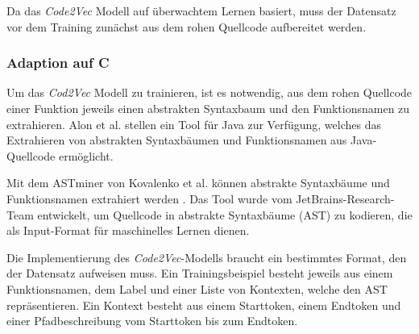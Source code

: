 \documentclass[12pt,letterpaper,ngerman]{article}
\begin{document}
Da das \textit{Code2Vec} Modell auf überwachtem Lernen basiert,
muss der Datensatz vor dem Training zunächst aus dem rohen Quellcode 
aufbereitet werden.
\subsubsection{Adaption auf C}
Um das \textit{Cod2Vec} Modell zu trainieren, ist es notwendig,
aus dem rohen Quellcode einer Funktion jeweils einen abstrakten 
Syntaxbaum und den
Funktionsnamen zu extrahieren. Alon et al. stellen ein Tool 
für Java zur Verfügung, welches das Extrahieren von abstrakten 
Syntaxbäumen und Funktionsnamen aus Java-Quellcode ermöglicht.

Mit dem ASTminer von Kovalenko et al. können abstrakte Syntaxbäume und 
Funktionsnamen extrahiert werden \cite{kovalenko2019pathminer}. 
Das Tool wurde vom JetBrains-Research-Team entwickelt, um Quellcode
in abstrakte Syntaxbäume (AST) zu 
kodieren, die als Input-Format für maschinelles Lernen dienen.

Die Implementierung des \textit{Code2Vec}-Modells braucht ein bestimmtes
Format, den der Datensatz aufweisen muss. Ein Trainingsbeispiel besteht
jeweils aus einem 
Funktionsnamen, dem Label und einer Liste von Kontexten, welche den AST 
repräsentieren. Ein Kontext besteht aus einem Starttoken, einem Endtoken 
und einer Pfadbeschreibung vom Starttoken bis zum Endtoken. 
\end{document}
